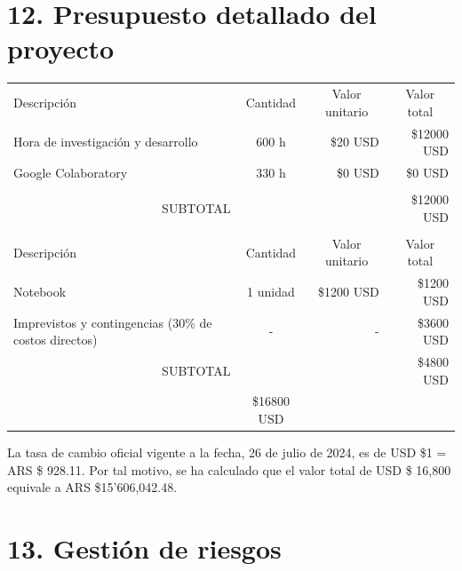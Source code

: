 \documentclass[
11pt, %
codirector, %
]{charter}
\begin{document}
\section{12. Presupuesto detallado del proyecto}
\label{sec:presupuesto}

\begin{table}[htpb]
\centering
\begin{tabularx}{\linewidth}{@{}|X|c|r|r|@{}}
\hline
\rowcolor[HTML]{C0C0C0} 
\multicolumn{4}{|c|}{\cellcolor[HTML]{C0C0C0}COSTOS DIRECTOS} \\ \hline
\rowcolor[HTML]{C0C0C0} 
Descripción &
  \multicolumn{1}{c|}{\cellcolor[HTML]{C0C0C0}Cantidad} &
  \multicolumn{1}{c|}{\cellcolor[HTML]{C0C0C0}Valor unitario} &
  \multicolumn{1}{c|}{\cellcolor[HTML]{C0C0C0}Valor total} \\ \hline
Hora de investigación y desarrollo &
  600 h &
  \$20 USD &
  \$12000 USD \\ \hline
Google Colaboratory &
  330 h &
  \$0 USD &
  \$0 USD \\ \hline
 &
  \multicolumn{1}{c|}{} &
  \multicolumn{1}{c|}{} &
  \multicolumn{1}{c|}{} \\ \hline
\multicolumn{3}{|c|}{SUBTOTAL} &
  \$12000 USD \\ \hline
\rowcolor[HTML]{C0C0C0} 
\multicolumn{4}{|c|}{\cellcolor[HTML]{C0C0C0}COSTOS INDIRECTOS} \\ \hline
\rowcolor[HTML]{C0C0C0} 
Descripción &
  \multicolumn{1}{c|}{\cellcolor[HTML]{C0C0C0}Cantidad} &
  \multicolumn{1}{c|}{\cellcolor[HTML]{C0C0C0}Valor unitario} &
  \multicolumn{1}{c|}{\cellcolor[HTML]{C0C0C0}Valor total} \\ \hline
Notebook &
  1 unidad &
  \$1200 USD &
  \$1200 USD \\ \hline
Imprevistos y contingencias (30\% de costos directos) &
  - &
  - &
  \$3600 USD \\ \hline
\multicolumn{3}{|c|}{SUBTOTAL} &
  \$4800 USD \\ \hline
\rowcolor[HTML]{C0C0C0}
\multicolumn{3}{|c|}{TOTAL} &
  \$16800 USD \\ \hline
\end{tabularx}%
\end{table}

La tasa de cambio oficial vigente a la fecha, 26 de julio de 2024, es de USD \$1 = ARS \$ 928.11. Por tal motivo, se ha calculado que el valor total de USD \$ 16,800 equivale a ARS \$15'606,042.48. 

\section{13. Gestión de riesgos}
\label{sec:riesgos}
\end{document}
